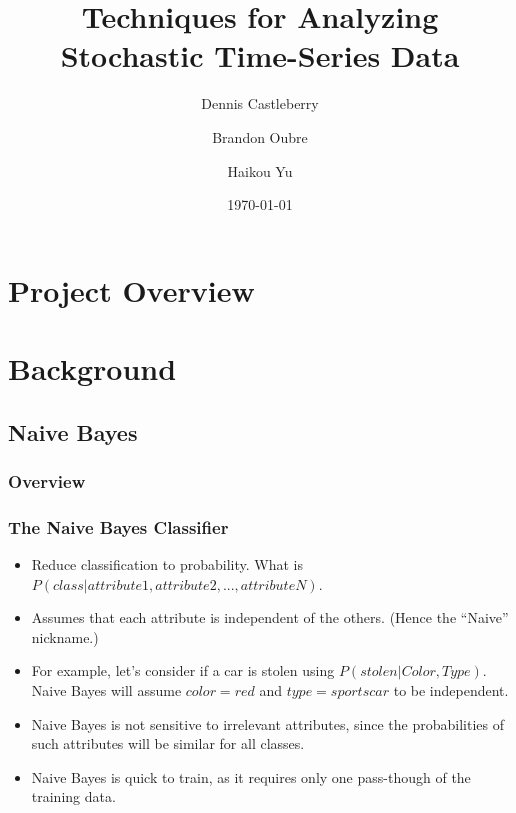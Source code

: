 \documentclass[mathserif]{beamer}
\begin{document}
	\title[Analyzing Stochastic Time-Series Data]{Techniques for Analyzing Stochastic Time-Series Data}
	\author[Castleberry \and Oubre \and Yu]{Dennis Castleberry \and Brandon Oubre \and Haikou Yu}
	\date{\today}
	\frame{\titlepage}
	
	\section{Project Overview}
	
	\section{Background}
	\subsection{Naive Bayes}
	\subsubsection{Overview}
	\begin{frame}
		\frametitle{The Naive Bayes Classifier}
		\begin{itemize}
			\item Reduce classification to probability. What is \(P(class | attribute1, attribute2, ..., attributeN)\).
			\item Assumes that each attribute is independent of the others. (Hence the ``Naive'' nickname.)
			\item For example, let's consider if a car is stolen using \(P(stolen | Color, Type)\). Naive Bayes will assume \(color=red\) and \(type=sportscar\) to be independent.
			\item Naive Bayes is not sensitive to irrelevant attributes, since the probabilities of such attributes will be similar for all classes.
			\item Naive Bayes is quick to train, as it requires only one pass-though of the training data.
		\end{itemize}
	\end{frame}
	
\end{document}
